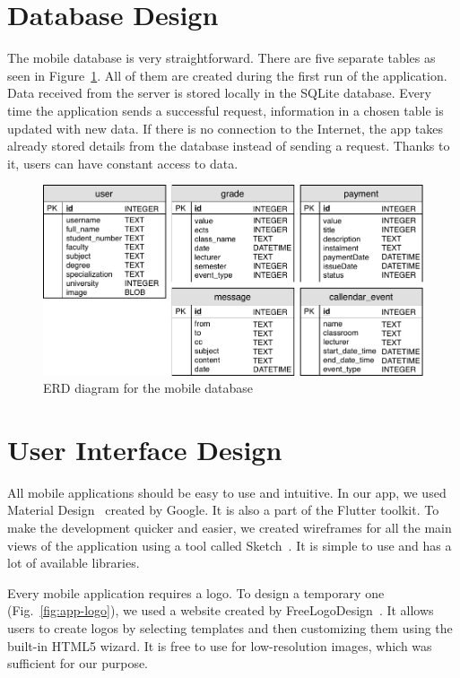 \section{Database Design}
The mobile database is very straightforward. There are five separate tables as seen in Figure~\ref{fig:erd-diagram}. All of them are created during the first run of the application. Data received from the server is stored locally in the SQLite database. Every time the application sends a successful request, information in a chosen table is updated with new data. If there is no connection to the Internet, the app takes already stored details from the database instead of sending a request. Thanks to it, users can have constant access to data.
\begin{figure}[htb]
    \centering
    \includegraphics[scale=0.8]{fig03/erd_diagram.pdf}
    \caption{ERD diagram for the mobile database}
    \label{fig:erd-diagram}
\end{figure}

\section{User Interface Design}
All mobile applications should be easy to use and intuitive. In our app, we used Material Design~\cite{material-design} created by Google. It is also a part of the Flutter toolkit. To make the development quicker and easier, we created wireframes for all the main views of the application using a tool called Sketch~\cite{sketch}. It is simple to use and has a lot of available libraries.

Every mobile application requires a logo. To design a temporary one (Fig.~\ref{fig:app-logo}), we used a website created by FreeLogoDesign~\cite{freelogodesign}. It allows users to create logos by selecting templates and then customizing them using the built-in HTML5 wizard. It is free to use for low-resolution images, which was sufficient for our purpose.

